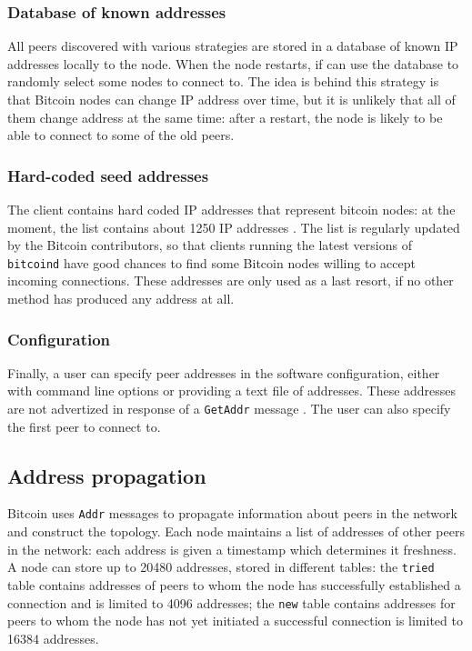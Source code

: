 \subsubsection{Database of known addresses}
All peers discovered with various strategies are stored in a database of known IP addresses locally to the node.
When the node restarts, if can use the database to randomly select some nodes to connect to.
The idea is behind this strategy is that Bitcoin nodes can change IP address over time, but it is unlikely that all of them change address at the same time:
after a restart, the node is likely to be able to connect to some of the old peers.

\subsubsection{Hard-coded seed addresses}
The client contains hard coded IP addresses that represent bitcoin nodes:
at the moment, the list contains about \num{1250} IP addresses \cite{bitcoin_seeds}.
The list is regularly updated by the Bitcoin contributors, so that clients running the latest versions of \texttt{bitcoind} have good chances to find some Bitcoin nodes willing to accept incoming connections.
These addresses are only used as a last resort, if no other method has produced any address at all.

\subsubsection{Configuration}
Finally, a user can specify peer addresses in the software configuration, either with command line options or providing a text file of addresses.
These addresses are not advertized in response of a \texttt{GetAddr} message \cite{bitcoin_peer_discovery}.
The user can also specify the first peer to connect to.

\subsection{Address propagation}
\label{sub:address-propagation}
Bitcoin uses \texttt{Addr} messages to propagate information about peers in the network and construct the topology.
Each node maintains a list of addresses of other peers in the network:
each address is given a timestamp which determines it freshness.
A node can store up to \num{20480} addresses, stored in different tables:
the \texttt{tried} table contains addresses of peers to whom the node has successfully established a connection and is limited to \num{4096} addresses;
the \texttt{new} table contains addresses for peers to whom the node has not yet initiated a successful connection is limited to \num{16384} addresses.

